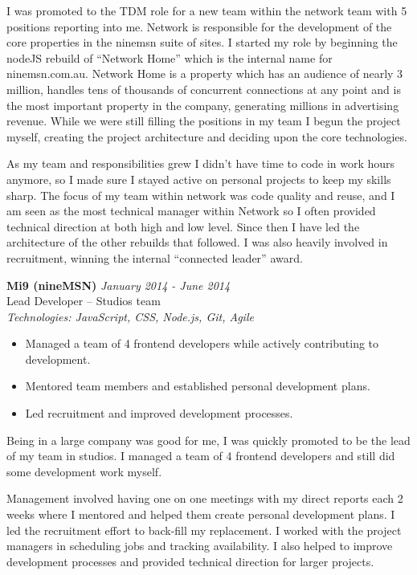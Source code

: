 \documentclass[a4paper,10pt]{article}
\begin{document}
I was promoted to the TDM role for a new team within the network team with 5 positions reporting into me. Network is responsible for the development of the core properties in the ninemsn suite of sites. I started my role by beginning the nodeJS rebuild of “Network Home” which is the internal name for ninemsn.com.au. Network Home is a property which has an audience of nearly 3 million, handles tens of thousands of concurrent connections at any point and is the most important property in the company, generating millions in advertising revenue. While we were still filling the positions in my team I begun the project myself, creating the project architecture and deciding upon the core technologies.

As my team and responsibilities grew I didn't have time to code in work hours anymore, so I made sure I stayed active on personal projects to keep my skills sharp. The focus of my team within network was code quality and reuse, and I am seen as the most technical manager within Network so I often provided technical direction at both high and low level. Since then I have led the architecture of the other rebuilds that followed. I was also heavily involved in recruitment, winning the internal “connected leader” award.

\vspace{1em}

\textbf{Mi9 (nineMSN)} \hfill \textit{January 2014 - June 2014} \\
Lead Developer – Studios team \\
\textit{Technologies: JavaScript, CSS, Node.js, Git, Agile}
\begin{itemize}
    \item Managed a team of 4 frontend developers while actively contributing to development.
    \item Mentored team members and established personal development plans.
    \item Led recruitment and improved development processes.
\end{itemize}

Being in a large company was good for me, I was quickly promoted to be the lead of my team in studios. I managed a team of 4 frontend developers and still did some development work myself.

Management involved having one on one meetings with my direct reports each 2 weeks where I mentored and helped them create personal development plans. I led the recruitment effort to back-fill my replacement. I worked with the project managers in scheduling jobs and tracking availability. I also helped to improve development processes and provided technical direction for larger projects.
\end{document}
